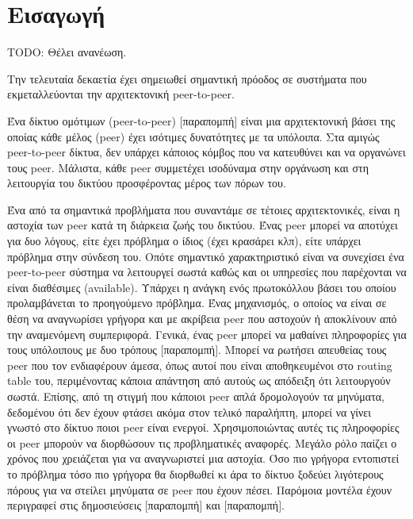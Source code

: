 \chapter{Εισαγωγή}
\label{chap:Intro}

TODO: Θέλει ανανέωση.

Την τελευταία δεκαετία έχει σημειωθεί σημαντική πρόοδος σε 
συστήματα που εκμεταλλεύονται την αρχιτεκτονική peer-to-peer.

Ένα δίκτυο ομότιμων (peer-to-peer) $[$παραπομπή$]$ είναι μια 
αρχιτεκτονική βάσει της οποίας κάθε μέλος (peer) έχει ισότιμες 
δυνατότητες με τα υπόλοιπα. Στα αμιγώς peer-to-peer δίκτυα, δεν υπάρχει 
κάποιος κόμβος που να κατευθύνει και να οργανώνει τους peer. Μάλιστα, 
κάθε peer συμμετέχει ισοδύναμα στην οργάνωση και στη λειτουργία του 
δικτύου προσφέροντας μέρος των πόρων του. 

Ένα από τα σημαντικά προβλήματα που συναντάμε σε τέτοιες αρχιτεκτονικές, 
είναι η αστοχία των peer κατά τη διάρκεια ζωής του δικτύου. Ένας peer 
μπορεί να αποτύχει για δυο λόγους, είτε έχει πρόβλημα ο ίδιος (έχει 
κρασάρει κλπ), είτε υπάρχει πρόβλημα στην σύνδεση του. Οπότε σημαντικό 
χαρακτηριστικό είναι να συνεχίσει ένα peer-to-peer σύστημα να λειτουργεί 
σωστά καθώς και οι υπηρεσίες που παρέχονται να είναι διαθέσιμες 
(available). Υπάρχει η ανάγκη ενός πρωτοκόλλου βάσει του οποίου 
προλαμβάνεται το προηγούμενο πρόβλημα. Ένας μηχανισμός, ο οποίος να 
είναι σε θέση να αναγνωρίσει γρήγορα και με ακρίβεια peer που αστοχούν ή 
αποκλίνουν από την αναμενόμενη συμπεριφορά. Γενικά, ένας peer μπορεί να 
μαθαίνει πληροφορίες για τους υπόλοιπους με δυο τρόπους $[$παραπομπή$]$. 
Μπορεί να ρωτήσει απευθείας τους peer που τον ενδιαφέρουν άμεσα, όπως 
αυτοί που είναι αποθηκευμένοι στο routing table του, περιμένοντας κάποια 
απάντηση από αυτούς ως απόδειξη ότι λειτουργούν σωστά. Επίσης, από τη 
στιγμή που κάποιοι peer απλά δρομολογούν τα μηνύματα, δεδομένου ότι δεν 
έχουν φτάσει ακόμα στον τελικό παραλήπτη, μπορεί να γίνει γνωστό στο 
δίκτυο ποιοι peer είναι ενεργοί. Χρησιμοποιώντας αυτές τις πληροφορίες 
οι peer μπορούν να διορθώσουν τις προβληματικές αναφορές. Μεγάλο ρόλο 
παίζει ο χρόνος που χρειάζεται για να αναγνωριστεί μια αστοχία. Όσο πιο 
γρήγορα εντοπιστεί το πρόβλημα τόσο πιο γρήγορα θα διορθωθεί κι άρα το 
δίκτυο ξοδεύει λιγότερους πόρους για να στείλει μηνύματα σε peer που 
έχουν πέσει. Παρόμοια μοντέλα έχουν περιγραφεί στις δημοσιεύσεις 
$[$παραπομπή$]$ και $[$παραπομπή$]$.

